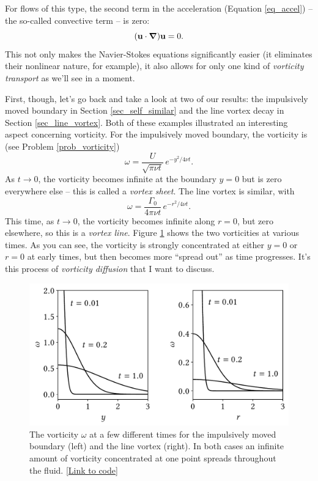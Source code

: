For flows of this type, the second term in the acceleration (Equation \ref{eq_accel}) -- the so-called convective term -- is zero:
\[
(\mathbf{u} \cdot \boldsymbol{\nabla}) \mathbf{u} = 0.
\]
This not only makes the Navier-Stokes equations significantly easier (it eliminates their nonlinear nature, for example), it also allows for only one kind of \emph{vorticity transport} as we'll see in a moment.

First, though, let's go back and take a look at two of our results:  the impulsively moved boundary in Section \ref{sec_self_similar} and the line vortex decay in Section \ref{sec_line_vortex}.  Both of these examples illustrated an interesting aspect concerning vorticity.  For the impulsively moved boundary, the vorticity is (see Problem \ref{prob_vorticity})
\begin{equation}
\label{eq_vort_1}
\omega = \frac{U}{\sqrt{\pi \nu t}} \, e^{-y^2 / 4 \nu t}.
\end{equation}
As $t \to 0$, the vorticity becomes infinite at the boundary $y=0$ but is zero everywhere else -- this is called a \emph{vortex sheet}.  The line vortex is similar, with 
\begin{equation}
\label{eq_vort_2}
\omega = \frac{\Gamma_0}{4\pi \nu t} \, e^{-r^2 / 4 \nu t}.
\end{equation}
This time, as $t \to 0$, the vorticity becomes infinite along $r=0$, but zero elsewhere, so this is a \emph{vortex line}.  Figure \ref{fig_vorticity_transport} shows the two vorticities at various times.  As you can see, the vorticity is strongly concentrated at either $y=0$ or $r=0$ at early times, but then becomes more ``spread out'' as time progresses.  It's this process of \emph{vorticity diffusion} that I want to discuss.

\begin{figure}
\centering
\includegraphics[width=0.8\linewidth]{Figures/Chapter2/fig_vorticity_transport}
\caption{The vorticity $\omega$ at a few different times for the impulsively moved boundary (left) and the line vortex (right).  In both cases an infinite amount of vorticity concentrated at one point spreads throughout the fluid. \href{https://nbviewer.jupyter.org/github/josephmacmillan/IntroFluidDynamics/blob/master/Jupyter/2-ViscousFluids.ipynb\#Figure-2.14:-Vorticity-transport}{[Link to code]}}
\label{fig_vorticity_transport}
\end{figure}

